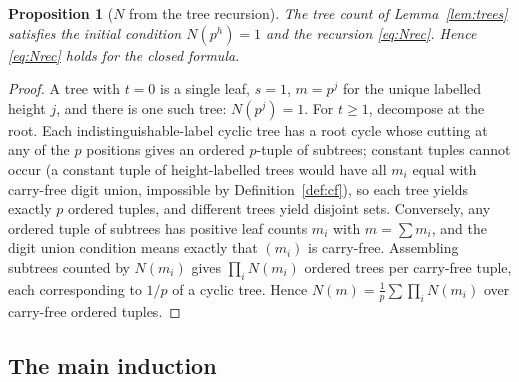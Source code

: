 \documentclass[11pt]{amsart}
\newtheorem{proposition}[theorem]{Proposition}
\theoremstyle{definition}
\theoremstyle{remark}
\newcommand{\Nn}{N}
\begin{document}
\begin{proposition}[$\Nn$ from the tree recursion]\label{prop:K}
The tree count of Lemma~\ref{lem:trees} satisfies the initial condition
$\Nn(p^h)=1$ and the recursion \eqref{eq:Nrec}. Hence \eqref{eq:Nrec} holds
for the closed formula.
\end{proposition}
\begin{proof}
A tree with $t=0$ is a single leaf, $s=1$, $m=p^{j}$ for the unique labelled
height $j$, and there is one such tree: $\Nn(p^j)=1$. For $t\ge1$, decompose
at the root. Each indistinguishable-label cyclic tree has a root cycle whose
cutting at any of the $p$ positions gives an ordered $p$-tuple of subtrees;
constant tuples cannot occur (a constant tuple of height-labelled trees would
have all $m_i$ equal with carry-free digit union, impossible by
Definition~\ref{def:cf}), so each tree yields exactly $p$ ordered tuples, and
different trees yield disjoint sets. Conversely, any ordered tuple of
subtrees has positive leaf counts $m_i$ with $m=\sum m_i$, and the digit
union condition means exactly that $(m_i)$ is carry-free. Assembling subtrees
counted by $\Nn(m_i)$ gives $\prod_i\Nn(m_i)$ ordered trees per carry-free
tuple, each corresponding to $1/p$ of a cyclic tree. Hence
$\Nn(m)=\frac1p\sum\prod_i\Nn(m_i)$ over carry-free ordered tuples.
\end{proof}

\subsection{The main induction}
\end{document}
